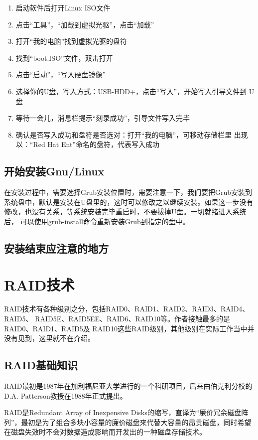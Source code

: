 \begin{enumerate}[itemsep=0pt,parsep=0pt]
\item 启动软件后打开Linux ISO文件
\item 点击“工具”，“加载到虚拟光驱”，点击“加载”
\item 打开“我的电脑”找到虚拟光驱的盘符 
\item 找到“boot.ISO”文件，双击打开
\item 点击“启动”，“写入硬盘镜像”
\item 选择你的U盘，写入方式：USB-HDD+，点击“写入”，开始写入引导文件到
  U盘
\item 等待一会儿，消息栏提示“刻录成功”，引导文件写入完毕
\item 确认是否写入成功和盘符是否选对：打开“我的电脑”，可移动存储栏里
  出现 以：“Red Hat Ent”命名的盘符，代表写入成功
\end{enumerate}

\section{开始安装Gnu/Linux}

在安装过程中，需要选择Grub安装位置时，需要注意一下，我们要把Grub安装到
系统盘中，默认是安装在U盘里的，这时可以修改之以继续安装。如果这一步没有
修改，也没有关系，等系统安装完毕重启时，不要拔掉U盘。一切就绪进入系统后，
可以使用grub-install命令重新安装Grub到指定的盘中。

\section{安装结束应注意的地方}

\chapter{RAID技术}

RAID技术有各种级别之分，包括RAID0、RAID1、RAID2、RAID3、RAID4、RAID5、
RAID5E、RAID5EE、RAID6、RAID10等。作者接触最多的是RAID0、RAID1、RAID5及
RAID10这些RAID级别，其他级别在实际工作当中并没有见到，这里就不在介绍。

\section{RAID基础知识}

RAID最初是1987年在加利福尼亚大学进行的一个科研项目，后来由伯克利分校的
D.A. Patterson教授在1988年正式提出。

RAID是Redundant Array of Inexpensive Disks的缩写，直译为“廉价冗余磁盘阵
列”，最初是为了组合多块小容量的廉价磁盘来代替大容量的昂贵磁盘，同时希望
在磁盘失效时不会对数据造成影响而开发出的一种磁盘存储技术。

